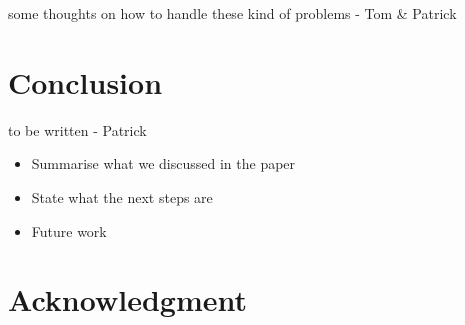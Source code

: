 \documentclass[conference]{IEEEtran}
\begin{document}
{\red some thoughts on how to handle these kind of problems - Tom \& Patrick}



\section{Conclusion}

{\red to be written - Patrick}

\begin{itemize}
\item Summarise what we discussed in the paper
\item State what the next steps are
\item Future work
\end{itemize}







\section*{Acknowledgment}






\end{document}
